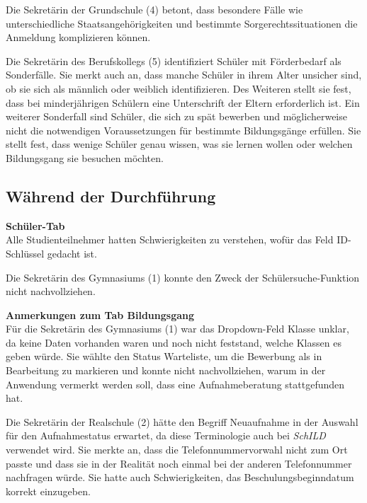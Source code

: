 Die Sekretärin der Grundschule (4) betont, dass besondere Fälle wie unterschiedliche Staatsangehörigkeiten und bestimmte Sorgerechtssituationen die Anmeldung komplizieren können.

Die Sekretärin des Berufskollegs (5) identifiziert Schüler mit Förderbedarf als Sonderfälle. Sie merkt auch an, dass manche Schüler in ihrem Alter unsicher sind, ob sie sich als männlich oder weiblich identifizieren. Des Weiteren stellt sie fest, dass bei minderjährigen Schülern eine Unterschrift der Eltern erforderlich ist. Ein weiterer Sonderfall sind Schüler, die sich zu spät bewerben und möglicherweise nicht die notwendigen Voraussetzungen für bestimmte Bildungsgänge erfüllen. Sie stellt fest, dass wenige Schüler genau wissen, was sie lernen wollen oder welchen Bildungsgang sie besuchen möchten.


\subsection{Während der Durchführung}

\textbf{\glqq Schüler\grqq{}-Tab}\\
Alle Studienteilnehmer hatten Schwierigkeiten zu verstehen, wofür das Feld \glqq ID-Schlüssel\grqq{} gedacht ist.

Die Sekretärin des Gymnasiums (1) konnte den Zweck der Schülersuche-Funktion nicht nachvollziehen.


\textbf{Anmerkungen zum Tab \glqq Bildungsgang\grqq{}}\\
Für die Sekretärin des Gymnasiums (1) war das Dropdown-Feld \glqq Klasse\grqq{} unklar, da keine Daten vorhanden waren und noch nicht feststand, welche Klassen es geben würde. Sie wählte den Status \glqq Warteliste\grqq{}, um die Bewerbung als \glqq in Bearbeitung\grqq{} zu markieren und konnte nicht nachvollziehen, warum in der Anwendung vermerkt werden soll, dass eine Aufnahmeberatung stattgefunden hat.

Die Sekretärin der Realschule (2) hätte den Begriff \glqq Neuaufnahme\grqq{} in der Auswahl für den Aufnahmestatus erwartet, da diese Terminologie auch bei \glqq  \textit{SchILD} \grqq{} verwendet wird. Sie merkte an, dass die Telefonnummervorwahl nicht zum Ort passte und dass sie in der Realität noch einmal bei der anderen Telefonnummer nachfragen würde. Sie hatte auch Schwierigkeiten, das Beschulungsbeginndatum korrekt einzugeben.

